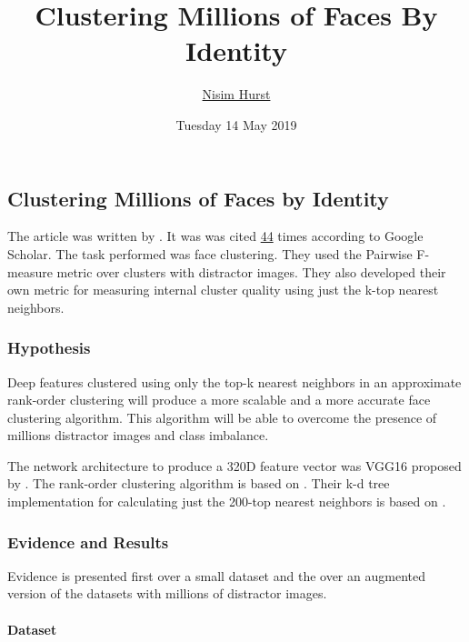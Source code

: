 \documentclass[17pt,]{extarticle}
\title{Clustering Millions of Faces By Identity}
\author{\href{mailto:langheran@gmail.com}{Nisim Hurst}}
\date{Tuesday 14 May 2019}
\let\oldparagraph\paragraph
\renewcommand{\paragraph}[1]{\oldparagraph{#1}\mbox{}}
\begin{document}
\maketitle

\label{toc}

\hypertarget{clustering-millions-of-faces-by-identity}{%
\subsection{Clustering Millions of Faces by Identity}\label{clustering-millions-of-faces-by-identity}}

The article was written by \autocite{otto2018}. It was was cited \href{https://scholar.google.com/scholar?cites=9743611198042490448\&as_sdt=2005\&sciodt=0,5\&hl=en}{44} times according to Google Scholar. The task performed was face clustering. They used the Pairwise F-measure metric over clusters with distractor images. They also developed their own metric for measuring internal cluster quality using just the k-top nearest neighbors.

\hypertarget{hypothesis}{%
\subsubsection{Hypothesis}\label{hypothesis}}

Deep features clustered using only the top-k nearest neighbors in an approximate rank-order clustering will produce a more scalable and a more accurate face clustering algorithm. This algorithm will be able to overcome the presence of millions distractor images and class imbalance.

The network architecture to produce a 320D feature vector was VGG16 proposed by \autocite{Simonyan2014}. The rank-order clustering algorithm is based on \autocite{zhu2011}. Their k-d tree implementation for calculating just the 200-top nearest neighbors is based on \autocite{muja2014}.

\hypertarget{evidence-and-results}{%
\subsubsection{Evidence and Results}\label{evidence-and-results}}

Evidence is presented first over a small dataset and the over an augmented version of the datasets with millions of distractor images.

\hypertarget{dataset}{%
\paragraph{Dataset}\label{dataset}}
\end{document}
